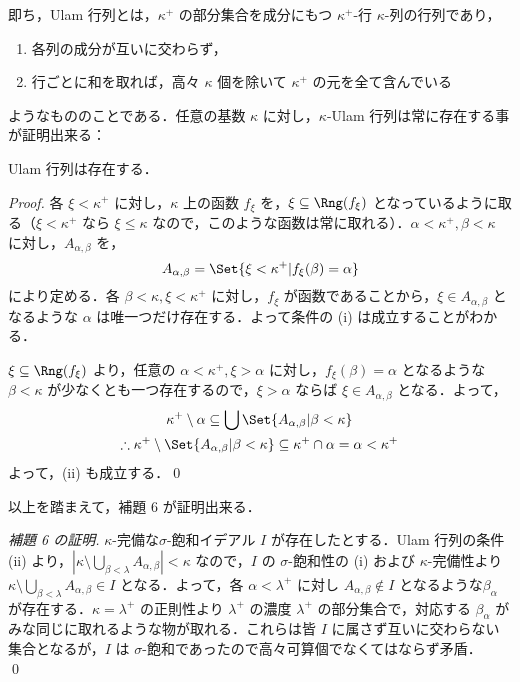 \documentclass[a4j]{ltjsarticle}
\begin{document}
即ち，Ulam 行列とは，$\kappa^+$ の部分集合を成分にもつ $\kappa^+$-行 $\kappa$-列の行列であり，
\begin{enumerate}[label=(\roman*)]
 \item 各列の成分が互いに交わらず，
 \item 行ごとに和を取れば，高々 $\kappa$ 個を除いて $\kappa^+$ の元を全て含んでいる
\end{enumerate}
ようなもののことである．任意の基数 $\kappa$ に対し，$\kappa$-Ulam 行列は常に存在する事が証明出来る：
\begin{lemma}\label{lem:Ulam-matrix-exists}
 Ulam 行列は存在する．
\end{lemma}
\begin{proof}
 各 $\xi < \kappa^+$ に対し，$\kappa$ 上の函数 $f_\xi$ を，$\xi \subseteq \Rng(f_\xi)$ となっているように取る（$\xi < \kappa^+$ なら $\xi \leq \kappa$ なので，このような函数は常に取れる）．$\alpha < \kappa^+, \beta < \kappa$ に対し，$A_{\alpha, \beta}$ を，
 \[
  A_{\alpha, \beta} = \Set{\xi < \kappa^+ | f_\xi(\beta) = \alpha }
 \]
 により定める．各 $\beta < \kappa, \xi < \kappa^+$ に対し，$f_\xi$ が函数であることから，$\xi \in A_{\alpha, \beta}$ となるような $\alpha$ は唯一つだけ存在する．よって条件の (i) は成立することがわかる．

 $\xi \subseteq \Rng(f_\xi)$ より，任意の $\alpha < \kappa^+, \xi > \alpha$ に対し，$f_\xi(\beta) = \alpha$ となるような $\beta < \kappa$ が少なくとも一つ存在するので，$\xi > \alpha$ ならば $\xi \in A_{\alpha, \beta}$ となる．よって，
 \begin{gather*}
  \kappa^+ \setminus \alpha \subseteq \bigcup\Set{ A_{\alpha, \beta} | \beta < \kappa}\\
  \therefore \kappa^+ \setminus \Set{ A_{\alpha, \beta} | \beta < \kappa}
  \subseteq \kappa^+ \cap \alpha = \alpha < \kappa^+
 \end{gather*}
 よって，(ii) も成立する．\qed
\end{proof}

以上を踏まえて，補題 $6$ が証明出来る．
\begin{proof}[補題 6 の証明]
 $\kappa$-完備な$\sigma$-飽和イデアル $I$ が存在したとする．Ulam 行列の条件 (ii) より，$|\kappa \setminus \bigcup_{\beta < \lambda} A_{\alpha, \beta}| < \kappa$ なので，$I$ の $\sigma$-飽和性の (i) および $\kappa$-完備性より $\kappa \setminus \bigcup_{\beta < \lambda} A_{\alpha, \beta} \in I$ となる．よって，各 $\alpha < \lambda^+$ に対し $A_{\alpha, \beta} \notin I$ となるような$\beta_\alpha$ が存在する．$\kappa = \lambda^+$ の正則性より $\lambda^+$ の濃度 $\lambda^+$ の部分集合で，対応する $\beta_\alpha$ がみな同じに取れるような物が取れる．これらは皆 $I$ に属さず互いに交わらない集合となるが，$I$ は $\sigma$-飽和であったので高々可算個でなくてはならず矛盾． \qed
\end{proof}
\end{document}
